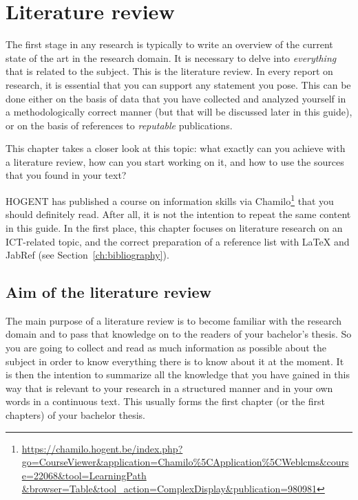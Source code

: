 \chapter{Literature review}
\label{ch:literaturereview}

The first stage in any research is typically to write an overview of the current state of the art in the research domain. It is necessary to delve into \emph{everything} that is related to the subject. This is the literature review. In every report on research, it is essential that you can support any statement you pose. This can be done either on the basis of data that you have collected and analyzed yourself in a methodologically correct manner (but that will be discussed later in this guide), or on the basis of references to \emph{reputable} publications.

This chapter takes a closer look at this topic: what exactly can you achieve with a literature review, how can you start working on it, and how to use the sources that you found in your text?

HOGENT has published a course on information skills via Chamilo\footnote{\url{https://chamilo.hogent.be/index.php?go=CourseViewer\&application=Chamilo\%5CApplication\%5CWeblcms\&course=22068\&tool=LearningPath \&browser=Table\&tool_action=ComplexDisplay\&publication=980981}} that you should definitely read. After all, it is not the intention to repeat the same content in this guide. In the first place, this chapter focuses on literature research on an ICT-related topic, and the correct preparation of a reference list with {\LaTeX} and JabRef (see Section~\ref{ch:bibliography}).

\section{Aim of the literature review}
\label{sec:aimliteraturereview}

The main purpose of a literature review is to become familiar with the research domain and to pass that knowledge on to the readers of your bachelor's thesis. So you are going to collect and read as much information as possible about the subject in order to know everything there is to know about it at the moment. It is then the intention to summarize all the knowledge that you have gained in this way that is relevant to your research in a structured manner and in your own words in a continuous text. This usually forms the first chapter (or the first chapters) of your bachelor thesis.

